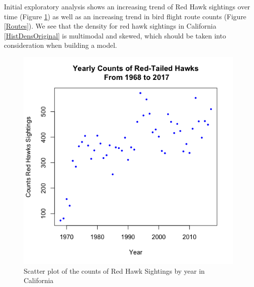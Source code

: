 \documentclass{asaproc}
\begin{document}
Initial exploratory analysis shows an increasing trend of Red Hawk sightings over time (Figure \ref{scatter_Eda}) as well as an increasing trend in bird flight route counts (Figure \ref{Routes}). We see that the density for red hawk sightings in California \ref{HistDensOriginal} is multimodal and skewed, which should be taken into consideration when building a model.

\begin{figure}
    \centering
    \includegraphics[scale=0.4]{Scatter_EDA.png}
    \caption{Scatter plot of the counts of Red Hawk Sightings by year in California}
    \label{scatter_Eda}
\end{figure}
\end{document}
